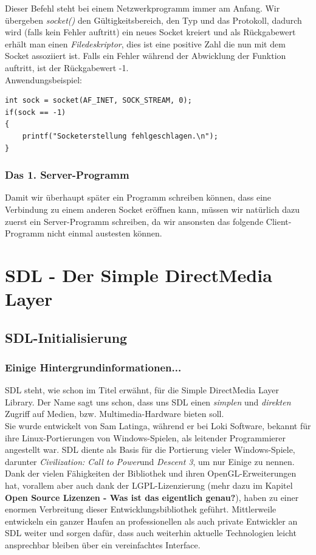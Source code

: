 \documentclass[b5paper,10pt,dvips,fleqn,titlepage,twoside]{book}
\begin{document}
Dieser Befehl steht bei einem Netzwerkprogramm immer am Anfang. Wir übergeben \emph{socket()} den Gültigkeitsbereich, den Typ und das Protokoll, dadurch wird (falls kein Fehler auftritt) ein neues Socket kreiert und als Rückgabewert erhält man einen \emph{Filedeskriptor}, dies ist eine positive Zahl die nun mit dem Socket assoziiert ist. Falls ein Fehler während der Abwicklung der Funktion auftritt, ist der Rückgabewert -1.\\
Anwendungsbeispiel:\\
\begin{verbatim}
int sock = socket(AF_INET, SOCK_STREAM, 0);
if(sock == -1)
{
	printf("Socketerstellung fehlgeschlagen.\n");
}
\end{verbatim}

\section{Das 1. Server-Programm}
\label{serverprogramm}
Damit wir überhaupt  später ein Programm schreiben können, dass eine Verbindung zu einem anderen Socket eröffnen kann, müssen wir natürlich dazu zuerst ein Server-Programm schreiben, da wir ansonsten das folgende Client-Programm nicht einmal austesten können.
\part{SDL - Der Simple DirectMedia Layer}
\label{part:SDL}
\chapter{SDL-Initialisierung}
\section{Einige Hintergrundinformationen...}
SDL steht, wie schon im Titel erw\"{a}hnt, f\"{u}r die Simple DirectMedia Layer Library. Der Name sagt uns schon, dass uns SDL einen \textit{simplen} und \textit{direkten} Zugriff auf Medien, bzw. Multimedia-Hardware bieten soll.
\\
Sie wurde entwickelt von Sam Latinga, w\"{a}hrend er bei Loki Software, bekannt f\"{u}r ihre Linux-Portierungen von Windows-Spielen, als leitender Programmierer angestellt war.
SDL diente als Basis f\"{u}r die Portierung vieler Windows-Spiele, darunter \emph{Civilization: Call to Power}und \emph{Descent 3}, um nur Einige zu nennen.\\
Dank der vielen F\"{a}higkeiten der Bibliothek und ihren OpenGL-Erweiterungen hat, vorallem aber auch dank der LGPL-Lizenzierung (mehr dazu im Kapitel \textbf{Open Source Lizenzen - Was ist das eigentlich genau?}), haben zu einer enormen Verbreitung dieser Entwicklungsbibliothek gef\"{u}hrt. Mittlerweile entwickeln ein ganzer Haufen an professionellen als auch private Entwickler an SDL weiter und sorgen daf\"{u}r, dass auch weiterhin aktuelle Technologien leicht ansprechbar bleiben \"{u}ber ein vereinfachtes Interface.
\end{document}
